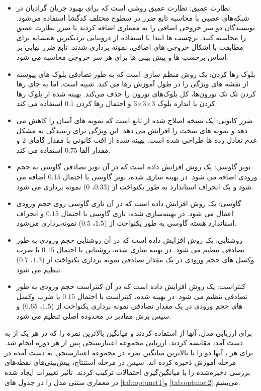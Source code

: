 \begin{itemize}
    \item نظارت عمیق: نظارت عمیق روشی است که برای بهبود جریان گرادیان در شبکه‌های عصبی با محاسبه تابع ضرر در سطوح مختلف کدگشا استفاده می‌شود. نویسندگان \cite{futrega2021optimized} دو سر خروجی اضافی را به معماری  اضافه کردند تا ضرر نظارت عمیق را محاسبه کنند. برچسب ها ابتدا با استفاده از درونیابی نزدیکترین همسایه برای مطابقت با اشکال خروجی های اضافی، نمونه برداری شدند. تابع ضرر نهایی بر اساس برچسب ها و پیش بینی ها برای هر سر خروجی محاسبه می شود.
    \item بلوک رها کردن: یک روش منظم سازی است که به طور تصادفی بلوک های پیوسته از نقشه های ویژگی را در طول آموزش رها می کند. شبیه  است، اما به جای رها کردن تک تک نورون‌ها، کل بلوک‌های نورون را حذف می‌کند.  بهینه شده از بلوک رها کردن با اندازه بلوک 3$\times$3$\times$3 و احتمال رها کردن $0.1$ استفاده می کند.
    \item ضرر کانونی: یک نسخه اصلاح شده از تابع  است که نمونه های آسان را کاهش می دهد و نمونه های سخت را افزایش می دهد. این ویژگی برای رسیدگی به مشکل عدم تعادل رده ها طراحی شده است.  بهینه شده از افت کانونی با مقدار گامای $2$ و مقدار آلفا $0.75$ استفاده می کند.
    \item نویز گاوسی: یک روش افزایش داده است که در آن نویز تصادفی گاوسی به حجم ورودی اضافه می شود. در  بهینه سازی شده، نویز گاوسی با احتمال $0.15$ اضافه می شود و یک انحراف استاندارد به طور یکنواخت از ($0.33$، $0$) نمونه برداری می شود.
    \item {}گاوسی: یک روش افزایش داده است که در آن تاری گاوسی روی حجم ورودی اعمال می شود. در  بهینه‌سازی شده، تاری گاوسی با احتمال $0.15$ و انحراف استاندارد هسته گاوسی به طور یکنواخت از ($1.5$، $0.5$) نمونه‌برداری می‌شود.
    \item روشنایی: یک روش افزایش داده است که در آن روشنایی حجم ورودی به طور تصادفی تنظیم می شود. در  بهینه سازی شده، روشنایی با احتمال $0.15$ با ضرب وکسل های حجم ورودی در یک مقدار تصادفی نمونه برداری یکنواخت از ($1.3$، $0.7$) تنظیم می شود.
    \item کنتراست: یک روش افزایش داده است که در آن کنتراست حجم ورودی به طور تصادفی تنظیم می شود. در  بهینه شده، کنتراست با احتمال $0.15$ با ضرب وکسل های حجم ورودی در یک مقدار تصادفی نمونه برداری یکنواخت از ($1.5$، $0.65$) و سپس برش مقادیر در محدوده اصلی تنظیم می شود.
\end{itemize}

برای ارزیابی مدل، آنها از  استفاده کردند و میانگین بالاترین نمره  را که در هر یک از  به دست آمد، مقایسه کردند. ارزیابی مجموعه اعتبارسنجی پس از هر دوره انجام شد. برای هر ، آنها دو را با بالاترین میانگین نمره  در مجموعه اعتبارسنجی به دست آمده در مرحله آموزش ذخیره کرده اند. سپس در مرحله استنتاج، پیش‌بینی‌های نقطه‌های بررسی ذخیره‌شده را با میانگین‌گیری احتمالات ترکیب کردند. تاثیر تغییرات ایجاد شده در معماری ستنی مدل  را در جدول های \ref{tab:optunet1}و \ref{tab:optunet2} می‌بینیم.

